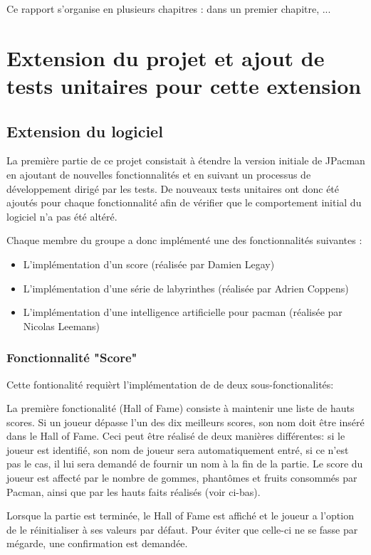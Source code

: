 \documentclass[12pt, openany]{report}
\begin{document}
 Ce rapport s'organise en plusieurs chapitres : dans un premier chapitre, ...
 
\section{Extension du projet et ajout de tests unitaires pour cette extension }

\subsection{Extension du logiciel}

La première partie de ce projet consistait à étendre la version initiale de JPacman en ajoutant de nouvelles fonctionnalités et en suivant un processus de développement dirigé par les tests. De nouveaux tests unitaires ont donc été ajoutés pour chaque fonctionnalité afin de vérifier que le comportement initial du logiciel n’a pas été altéré. 

Chaque membre du groupe a donc implémenté une des fonctionnalités suivantes :
\begin{itemize}
\item L'implémentation d'un score (réalisée par Damien Legay)
\item L'implémentation d'une série de labyrinthes (réalisée par Adrien Coppens)
\item L'implémentation d'une intelligence artificielle pour pacman (réalisée par Nicolas Leemans)
\end{itemize}


\subsubsection{Fonctionnalité "Score"}\label{score}
Cette fontionalité requièrt l'implémentation de de deux sous-fonctionalités:

La première fonctionalité (Hall of Fame) consiste à maintenir une liste de hauts scores. Si un joueur dépasse l'un des dix meilleurs scores, son nom doit être inséré dans le Hall of Fame.
Ceci peut être réalisé de deux manières différentes: si le joueur est identifié, son nom de joueur sera automatiquement entré, si ce n'est pas le cas, il lui sera demandé de fournir un nom à la fin de la partie.
Le score du joueur est affecté par le nombre de gommes, phantômes et fruits consommés par Pacman, ainsi que par les hauts faits réalisés (voir ci-bas).

Lorsque la partie est terminée, le Hall of Fame est affiché et le joueur a l'option de le réinitialiser à ses valeurs par défaut. Pour éviter que celle-ci ne se fasse par mégarde, une confirmation est demandée.
\end{document}
